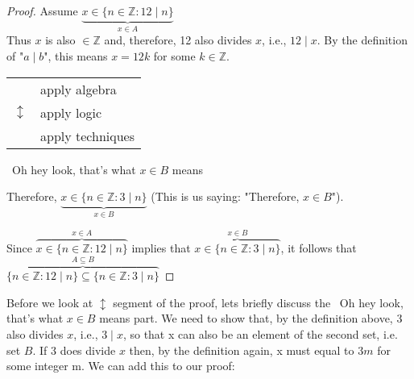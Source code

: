 \documentclass{amsart} %
\theoremstyle{definition} %
\theoremstyle{definition}
\theoremstyle{remark} %
\begin{document}
\begin{proof}
      Assume $\underbrace{x \in \{n \in \mathbb{Z}: 12\mid n \}}_{x \in A}$ \\
      Thus $x$ is also $\in \mathbb{Z}$ and, therefore, 12 also divides $x$, i.e., $12\mid x$. By the definition of "$a\mid b$", this means $x=12k$ for some $k \in \mathbb{Z}$.

      \begin{center}
      \begin{tabular}{r l}
            \multirow{3}{*}{\huge $\updownarrow$} & apply algebra \\ %
            & apply logic \\
            & apply techniques \\
      \end{tabular}
      \end{center}

      \begin{center}
      \guillemotleft\ Oh hey look, that's what $x \in B$ means \guillemotright
      \end{center}

      Therefore, $\underbrace{x \in \{n \in \mathbb{Z} : 3\mid n \}}_{x \in B}$ (This is us saying: "Therefore, $x \in B$").

      Since $\overbrace{x \in\{n \in \mathbb{Z}: 12\mid n \}}^{x \in A}$ implies that $\overbrace{x \in \{n \in \mathbb{Z} : 3\mid n \}}^{x \in B}$, it follows that \\ $\overbrace{\{n \in \mathbb{Z}: 12\mid n \} \subseteq \{n \in \mathbb{Z} : 3\mid n \}}^{A \subseteq B}$

\end{proof}

Before we look at $\updownarrow$ segment of the proof, lets briefly discuss the \guillemotleft\ Oh hey look, that's what $x \in B$ means \guillemotright part. We need to show that, by the definition above, 3 also divides $x$, i.e., $3\mid x$, so that x can also be an element of the second set, i.e. set $B$. If 3 does divide $x$ then, by the definition again, x must equal to $3m$ for some integer m. We can add this to our proof:
\end{document}
